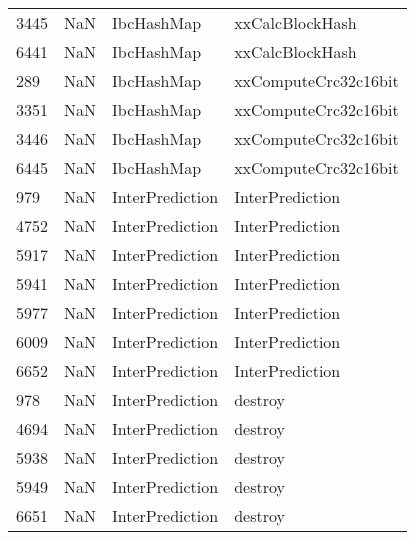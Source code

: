 \begin{tabular}{llll}
3445 &                   NaN &                 IbcHashMap &                           xxCalcBlockHash \\
6441 &                   NaN &                 IbcHashMap &                           xxCalcBlockHash \\
289  &                   NaN &                 IbcHashMap &                      xxComputeCrc32c16bit \\
3351 &                   NaN &                 IbcHashMap &                      xxComputeCrc32c16bit \\
3446 &                   NaN &                 IbcHashMap &                      xxComputeCrc32c16bit \\
6445 &                   NaN &                 IbcHashMap &                      xxComputeCrc32c16bit \\
979  &                   NaN &            InterPrediction &                           InterPrediction \\
4752 &                   NaN &            InterPrediction &                           InterPrediction \\
5917 &                   NaN &            InterPrediction &                           InterPrediction \\
5941 &                   NaN &            InterPrediction &                           InterPrediction \\
5977 &                   NaN &            InterPrediction &                           InterPrediction \\
6009 &                   NaN &            InterPrediction &                           InterPrediction \\
6652 &                   NaN &            InterPrediction &                           InterPrediction \\
978  &                   NaN &            InterPrediction &                                   destroy \\
4694 &                   NaN &            InterPrediction &                                   destroy \\
5938 &                   NaN &            InterPrediction &                                   destroy \\
5949 &                   NaN &            InterPrediction &                                   destroy \\
6651 &                   NaN &            InterPrediction &                                   destroy \\

\end{tabular}
